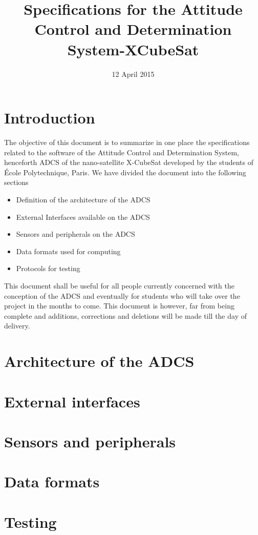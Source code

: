 \documentclass[11pt,a4paper]{report}
\title{Specifications for the Attitude Control and Determination System-XCubeSat}
\date{12 April 2015}
\begin{document}
\maketitle

\tableofcontents

\chapter{Introduction}

The objective of this document is to summarize in one place the specifications related to the software of the Attitude Control and Determination System, henceforth ADCS of the nano-satellite X-CubeSat developed by the students of École Polytechnique, Paris. We have divided the document into the following sections 

\begin{itemize}
\item 
Definition of the architecture of the ADCS 
\item 
External Interfaces available on the ADCS 
\item 
Sensors and peripherals on the ADCS 
\item 
Data formats used for computing 
\item 
Protocols for testing 
\end{itemize}

This document shall be useful for all people currently concerned with the conception of the ADCS and eventually for students who will take over the project in the months to come. This document is however, far from being complete and additions, corrections and deletions will be made till the day of delivery. 

\chapter{Architecture of the ADCS}\thispagestyle{fancy}
\chapter{External interfaces} \thispagestyle{fancy}

\chapter{Sensors and peripherals} \thispagestyle{fancy}

\chapter{Data formats}\thispagestyle{fancy}

\chapter{Testing}\thispagestyle{fancy} 
\end{document}
